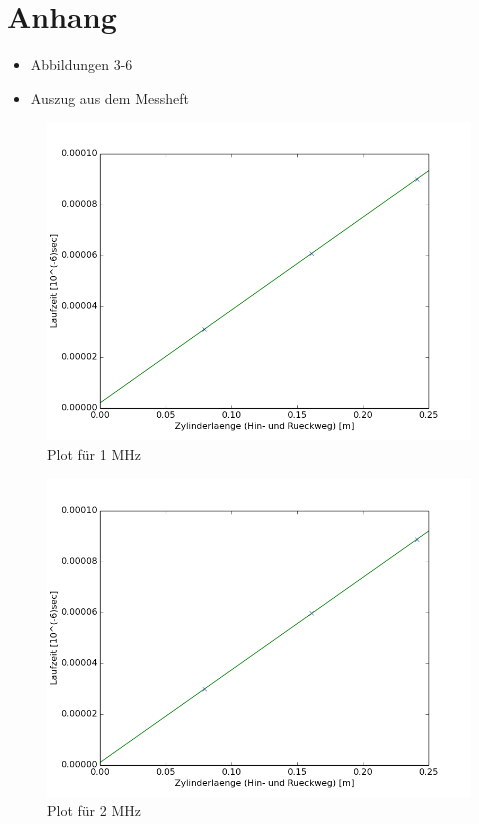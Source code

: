 \documentclass[11pt,ngerman,a4paper]{article}
\begin{document}
\section{Anhang}
\begin{itemize}
\item Abbildungen 3-6
\item Auszug aus dem Messheft
\end{itemize}
\newpage
\begin{figure}[h]
\includegraphics[width=12cm]{Fig1.png}
\caption{Plot für 1 MHz}
\label{fig1}
\end{figure}
\newpage
\begin{figure}[h]
\includegraphics[width=12cm]{Fig2.png}
\caption{Plot für 2 MHz}
\label{fig2}
\end{figure}
\newpage
\end{document}
